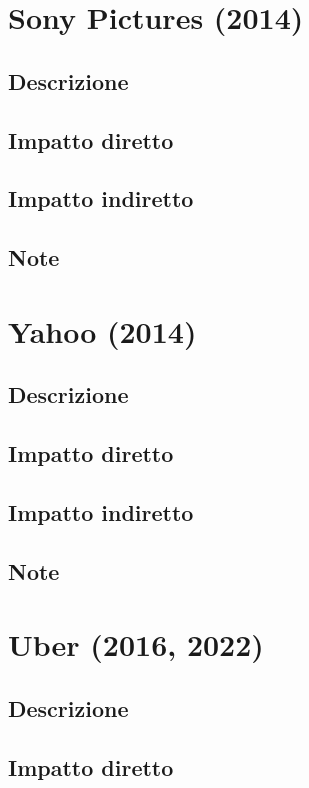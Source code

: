 \documentclass[12pt,a4paper,openright,twoside]{report}
\begin{document}
\section{Sony Pictures (2014)}
\subsection{Descrizione}

\subsection{Impatto diretto}

\subsection{Impatto indiretto}

\subsection{Note}
\section{Yahoo (2014)}
\subsection{Descrizione}

\subsection{Impatto diretto}

\subsection{Impatto indiretto}

\subsection{Note}
\section{Uber (2016, 2022)}
\subsection{Descrizione}

\subsection{Impatto diretto}
\end{document}
